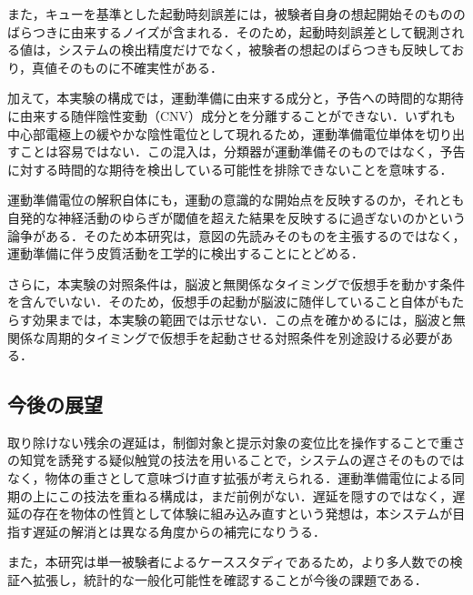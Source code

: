 \documentclass[twoside]{wiss}
\begin{document}
また，キューを基準とした起動時刻誤差には，被験者自身の想起開始そのもののばらつきに由来するノイズが含まれる．そのため，起動時刻誤差として観測される値は，システムの検出精度だけでなく，被験者の想起のばらつきも反映しており，真値そのものに不確実性がある．

加えて，本実験の構成では，運動準備に由来する成分と，予告への時間的な期待に由来する随伴陰性変動（CNV）成分とを分離することができない．いずれも中心部電極上の緩やかな陰性電位として現れるため，運動準備電位単体を切り出すことは容易ではない．この混入は，分類器が運動準備そのものではなく，予告に対する時間的な期待を検出している可能性を排除できないことを意味する．

運動準備電位の解釈自体にも，運動の意識的な開始点を反映するのか，それとも自発的な神経活動のゆらぎが閾値を超えた結果を反映するに過ぎないのかという論争がある\cite{schurger2012}．そのため本研究は，意図の先読みそのものを主張するのではなく，運動準備に伴う皮質活動を工学的に検出することにとどめる．

さらに，本実験の対照条件は，脳波と無関係なタイミングで仮想手を動かす条件を含んでいない．そのため，仮想手の起動が脳波に随伴していること自体がもたらす効果までは，本実験の範囲では示せない．この点を確かめるには，脳波と無関係な周期的タイミングで仮想手を起動させる対照条件を別途設ける必要がある．

\subsection{今後の展望}

取り除けない残余の遅延は，制御対象と提示対象の変位比を操作することで重さの知覚を誘発する疑似触覚の技法を用いることで\cite{samad2019}，システムの遅さそのものではなく，物体の重さとして意味づけ直す拡張が考えられる．運動準備電位による同期の上にこの技法を重ねる構成は，まだ前例がない．遅延を隠すのではなく，遅延の存在を物体の性質として体験に組み込み直すという発想は，本システムが目指す遅延の解消とは異なる角度からの補完になりうる．

また，本研究は単一被験者によるケーススタディであるため，より多人数での検証へ拡張し，統計的な一般化可能性を確認することが今後の課題である．



\end{document}
